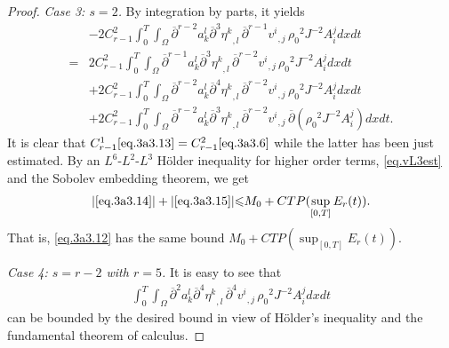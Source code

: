 \documentclass[12pt,twoside,reqno]{amsart}
\numberwithin{equation}{section}
\theoremstyle{definition}
\theoremstyle{remark}
\begin{document}
\begin{proof}
\emph{Case 3: $s=2$.} By integration by parts, it yields
\begin{align}
  &-2C_{r-1}^2{\int_0^T\!\!\!\!\int_\Omega }{\overline{\partial}}^{r-2} a_k^l{\overline{\partial}}^3 {{{\eta^k}}_{,{l}}\,}{{{{\overline{\partial}}^{r-1} v^i}}_{,{j}}\,}{\rho_0}^2 J^{-2}A^j_idxdt\label{eq.3a3.12}\\
  =&2C_{r-1}^2{\int_0^T\!\!\!\!\int_\Omega }{\overline{\partial}}^{r-1} a_k^l{\overline{\partial}}^3 {{{\eta^k}}_{,{l}}\,}{{{{\overline{\partial}}^{r-2} v^i}}_{,{j}}\,}{\rho_0}^2 J^{-2}A^j_idxdt\label{eq.3a3.13}\\
  &+2C_{r-1}^2{\int_0^T\!\!\!\!\int_\Omega }{\overline{\partial}}^{r-2} a_k^l{\overline{\partial}}^4 {{{\eta^k}}_{,{l}}\,}{{{{\overline{\partial}}^{r-2} v^i}}_{,{j}}\,}{\rho_0}^2 J^{-2}A^j_idxdt\label{eq.3a3.14}\\
  &+2C_{r-1}^2{\int_0^T\!\!\!\!\int_\Omega }{\overline{\partial}}^{r-2} a_k^l{\overline{\partial}}^3 {{{\eta^k}}_{,{l}}\,}{{{{\overline{\partial}}^{r-2} v^i}}_{,{j}}\,}{\overline{\partial}}({\rho_0}^2 J^{-2}A^j_i)dxdt.\label{eq.3a3.15}
\end{align}
It is clear that $C_{r-1}^1\eqref{eq.3a3.13}=C_{r-1}^2\eqref{eq.3a3.6}$ while the latter has been just estimated. By an $L^6$-$L^2$-$L^3$ H\"older inequality for higher order terms, \eqref{eq.vL3est} and the Sobolev embedding theorem, we get
\begin{align*}
  {\vert{\eqref{eq.3a3.14}}\vert}+{\vert{\eqref{eq.3a3.15}}\vert}{\leqslant} M_0 +CTP(\sup_{[0,T]}E_r(t)).
\end{align*}
That is, \eqref{eq.3a3.12} has the same bound $M_0 +CTP(\sup_{[0,T]}E_r(t))$.

\emph{Case 4: $s=r-2$ with $r=5$.} It is easy to see that
\begin{align}
  {\int_0^T\!\!\!\!\int_\Omega }{\overline{\partial}}^2 a_k^l{\overline{\partial}}^4 {{{\eta^k}}_{,{l}}\,}{{{{\overline{\partial}}^4 v^i}}_{,{j}}\,}{\rho_0}^2 J^{-2}A^j_idxdt
\end{align}
can be bounded by the desired bound in view of H\"older's inequality and the fundamental theorem of calculus.


\end{proof}
\end{document}
